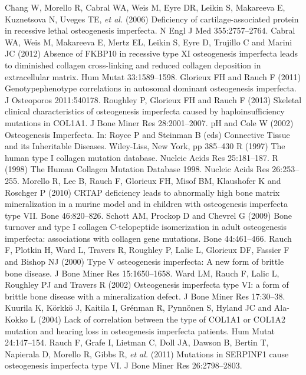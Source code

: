 \begin{biblio}[References]
 Chang W, Morello R, Cabral WA, Weis M, Eyre DR, Leikin S, Makareeva E, Kuznetsova N, Uveges TE, \textit{et al.} (2006) Deficiency of cartilage-associated protein in recessive lethal osteogenesis imperfecta. N Engl J Med 355:2757–2764.
 Cabral WA, Weis M, Makareeva E, Mertz EL, Leikin S, Eyre D, Trujillo C and Marini JC (2012) Absence of FKBP10 in recessive type XI osteogenesis imperfecta leads to diminished collagen cross-linking and reduced collagen deposition in extracellular matrix. Hum Mutat 33:1589–1598.
 Glorieux FH and Rauch F (2011) Genotypephenotype correlations in autosomal dominant osteogenesis imperfecta. J Osteoporos 2011:540178.
 Roughley P, Glorieux FH and Rauch F (2013) Skeletal clinical characteristics of osteogenesis imperfecta caused by haploinsufficiency mutations in COL1A1. J Bone Miner Res 28:2001–2007.
pH and Cole W (2002) Osteogenesis Imperfecta. In: Royce P and Steinman B (eds) Connective Tissue and its Inheritable Diseases. Wiley-Liss, New York, pp 385–430
R (1997) The human type I collagen mutation database. Nucleic Acids Res 25:181–187.
R (1998) The Human Collagen Mutation Database 1998. Nucleic Acids Res 26:253–255.
 Morello R, Lee B, Rauch F, Glorieux FH, Misof BM, Klaushofer K and Roschger P (2010) CRTAP deficiency leads to abnormally high bone matrix mineralization in a murine model and in children with osteogenesis imperfecta type VII. Bone 46:820–826.
 Schott AM, Prockop D and Chevrel G (2009) Bone turnover and type I collagen C-telopeptide isomerization in adult osteogenesis imperfecta: associations with collagen gene mutations. Bone 44:461–466.
 Rauch F, Plotkin H, Ward L, Travers R, Roughley P, Lalic L, Glorieux DF, Fassier F and Bishop NJ (2000) Type V osteogenesis imperfecta: A new form of brittle bone disease. J Bone Miner Res 15:1650–1658.
 Ward LM, Rauch F, Lalic L, Roughley PJ and Travers R (2002) Osteogenesis imperfecta type VI: a form of brittle bone disease with a mineralization defect. J Bone Miner Res 17:30–38.
 Kuurila K, Körkkö J, Kaitila I, Grénman R, Pynnönen S, Hyland JC and Ala-Kokko L (2004) Lack of correlation between the type of COL1A1 or COL1A2 mutation and hearing loss in osteogenesis imperfecta patients. Hum Mutat 24:147–154.
 Rauch F, Grafe I, Lietman C, Doll JA, Dawson B, Bertin T, Napierala D, Morello R, Gibbs R, \textit{et al.} (2011) Mutations in SERPINF1 cause osteogenesis imperfecta type VI. J Bone Miner Res 26:2798–2803.

\end{biblio}

